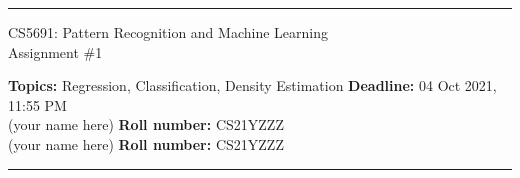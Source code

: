 \documentclass[addpoints,12pt,solution]{exam}
\begin{document}
\hrule
\vspace{1mm}
\noindent 
\begin{center}
{\Large CS5691: Pattern Recognition and Machine Learning} \\
{\large Assignment \#1}
\end{center}
\vspace{1mm}
\noindent 
\small{\textbf{Topics:} Regression, Classification, Density Estimation \hfill \textbf{Deadline:} 04 Oct 2021, 11:55 PM} \\


 (your name here) \hfill {\bf Roll number:} CS21YZZZ \\
 (your name here) \hfill {\bf Roll number:} CS21YZZZ \\
\vspace{2mm}
\hrule
\end{document}
